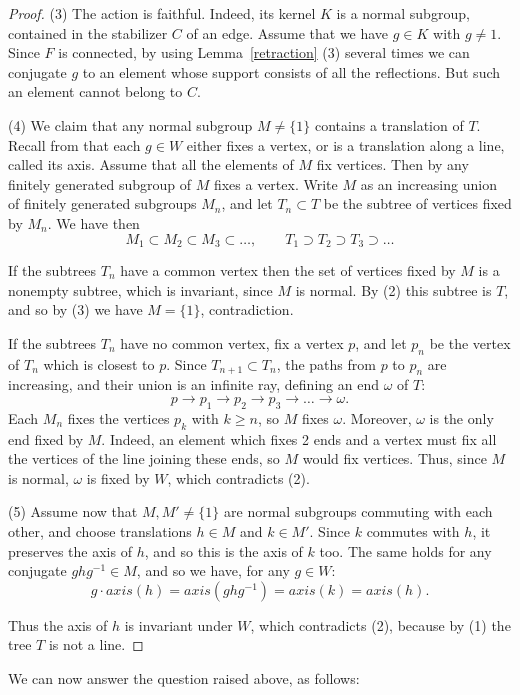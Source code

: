\documentclass[11pt,a4paper]{article}
\begin{document}
\begin{proof}
(3) The action is faithful. Indeed, its kernel $K$ is a normal subgroup, contained in the stabilizer $C$ of an edge. Assume that we have $g\in K$ with $g\neq1$. Since $F$ is connected, by using Lemma~\ref{retraction} (3) several times we can conjugate $g$ to an element whose support consists of all the reflections. But such an element cannot belong to $C$.

(4) We claim that any normal subgroup $M\neq\{1\}$ contains a translation of $T$. Recall from \cite{trees} that each $g\in W$ either fixes a vertex, or is a translation along a line, called its axis. Assume that all the elements of $M$ fix vertices. Then by \cite{trees} any finitely generated subgroup of $M$ fixes a vertex. Write $M$ as an increasing union of finitely generated subgroups $M_n$, and let $T_n\subset T$ be the subtree of vertices fixed by $M_n$. We have then
\[
 M_1\subset M_2\subset M_3\subset\ldots,\qquad T_1\supset T_2\supset T_3\supset\ldots
\]

If the subtrees $T_n$ have a common vertex then the set of vertices fixed by $M$ is a nonempty subtree, which is invariant, since $M$ is normal. By (2) this subtree is $T$, and so by (3) we have $M=\{1\}$, contradiction. 

If the subtrees $T_n$ have no common vertex, fix a vertex $p$, and let $p_n$ be the vertex of $T_n$ which is closest to $p$. Since $T_{n+1}\subset T_n$, the paths from $p$ to $p_n$ are increasing, and their union is an infinite ray, defining an end $\omega$ of $T$:
\[
 p\to p_1\to p_2\to p_3\to\ldots\to\omega.
\]
 Each $M_n$ fixes the vertices $p_k$ with $k\geq n$, so $M$ fixes $\omega$. Moreover, $\omega$ is the only end fixed by $M$. Indeed, an element which fixes 2 ends and a vertex must fix all the vertices of the line joining these ends, so $M$ would fix vertices. Thus, since $M$ is normal, $\omega$ is fixed by $W$, which contradicts (2).

(5) Assume now that $M,M'\neq\{1\}$ are normal subgroups commuting with each other, and choose translations $h\in M$ and $k\in M'$. Since $k$ commutes with $h$, it preserves the axis of $h$, and so this is the axis of $k$ too. The same holds for any conjugate $ghg^{-1}\in M$, and so we have, for any $g\in W$:
\[
 g\cdot axis(h)=axis(ghg^{-1})=axis(k)=axis(h).
\]

Thus the axis of $h$ is invariant under $W$, which contradicts (2), because by (1) the tree $T$ is not a line.
\end{proof}

We can now answer the question raised above, as follows:
\end{document}
